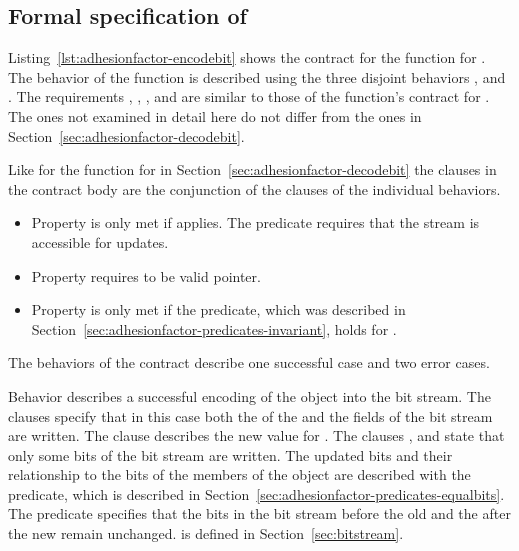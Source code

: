 \FloatBarrier

\subsection{Formal specification of }
\label{sec:adhesionfactor-encodebit}

Listing~\ref{lst:adhesionfactor-encodebit} shows the contract
for the  function for .
The behavior of the function is described using the three
disjoint behaviors , 
and .
The requirements , ,
,  and 
are similar to those of the  function's
contract for .
The ones not examined in detail here do not differ from
the ones in Section~\ref{sec:adhesionfactor-decodebit}.

Like for the  function for 
in Section~\ref{sec:adhesionfactor-decodebit} the 
clauses in the contract body are the conjunction of the
 clauses of the individual behaviors.

\begin{itemize}
\item
Property  is only met if  applies.
The predicate  requires that the
stream is accessible for updates.
\item
Property  requires  to be valid pointer.
\item
Property  is only met if the  predicate,
which was described in Section~\ref{sec:adhesionfactor-predicates-invariant},
holds for .
\end{itemize}

The behaviors of the  contract describe
one successful case and two error cases.

Behavior  describes a successful
encoding of the object  into the bit stream.
The  clauses specify that in this case both
the  of the  and the fields
of the bit stream are written.
The  clause describes the new value for
.
The  clauses , 
and  state that only some bits of the
bit stream are written.
The updated bits and their relationship to the
bits of the members of the object 
are described with the  predicate,
which is described in
Section~\ref{sec:adhesionfactor-predicates-equalbits}.
The  predicate specifies that the
bits in the bit stream before the old 
and the after the new 
remain unchanged.
is defined in Section~\ref{sec:bitstream}.

